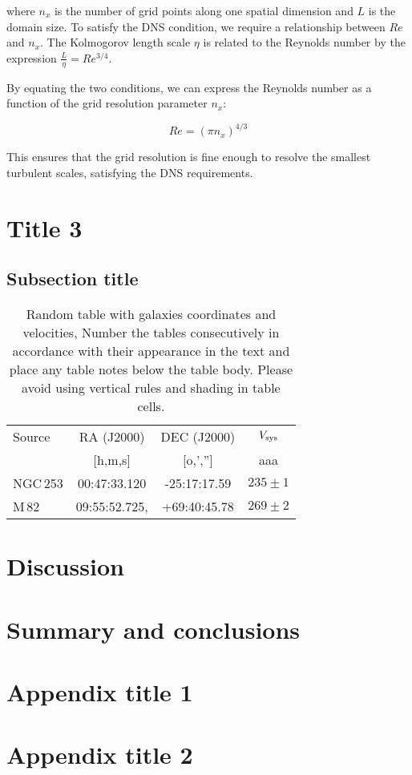 \documentclass[final,5p,times,twocolumn,authoryear]{elsarticle}
\begin{document}
where $n_x$ is the number of grid points along one spatial dimension and $L$ is the domain size. To satisfy the DNS condition, we require a relationship between $Re$ and $n_x$. The Kolmogorov length scale $\eta$ is related to the Reynolds number by the expression $\frac{L}{\eta} = Re^{3/4}$.

By equating the two conditions, we can express the Reynolds number as a function of the grid resolution parameter $n_x$:

\begin{equation}
Re = \left( \pi n_x \right)^{4/3}
\end{equation}

This ensures that the grid resolution is fine enough to resolve the smallest turbulent scales, satisfying the DNS requirements.


\section{Title 3}

\subsection{Subsection title}

\begin{table}[h]
\begin{tabular}{l c c c} 
 \hline
 Source & RA (J2000) & DEC (J2000) & $V_{\rm sys}$ \\ 
        & [h,m,s]    & [o,','']    & aaa         \\
 \hline
 NGC\,253 & 	00:47:33.120 & -25:17:17.59 & $235 \pm 1$ \\ 
 M\,82 & 09:55:52.725, & +69:40:45.78 & $269 \pm 2$ 	 \\ 
 \hline
\end{tabular}
\caption{Random table with galaxies coordinates and velocities, Number the tables consecutively in
accordance with their appearance in the text and place any table notes below the table body. Please avoid using vertical rules and shading in table cells.
}
\label{Table1}
\end{table}


\section{Discussion}

\section{Summary and conclusions}

\appendix

\section{Appendix title 1}


\section{Appendix title 2}

 

\end{document}

